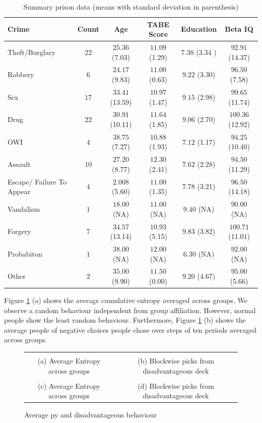 \documentclass[12pt,a4paper,bibliography=totocnumbered,listof=totocnumbered]{scrartcl}
\begin{document}
\begin{table}[H]
	\scriptsize
	 \centering 
	\begin{tabular}{ l|ccccc} 
		\toprule 
		Crime & \textbf{Count} & \textbf{Age} & \textbf{TABE Score} & \textbf{Education} & \textbf{Beta IQ} \\ 
		\hline
	Theft/Burglary & $22$ & $25.36$  (7.03) & $11.09$ (1.29) & $7.38$ (3.34 )& $92.91$ (14.37) \\ 
	Robbery & $6$ & $24.17$ (9.83) & $11.00$ (0.63) & $9.22$ (3.30) & $96.50$ (7.58) \\          
	Sex & $17$ & $33.41$ (13.59) & $10.97$ (1.47) & $9.15$ (2.98) & $99.65$ (11.74) \\       
	Drug & $22$ & $30.91$ (10.11)  & $11.64$ (1.85)& $9.06$   (2.70)  & $100.36$ (12.92) \\     
	OWI & $4$ & $38.75$ (7.27) & $10.88$ (1.93) & $7.12$ (1.17)& $94.25$ (10.40) \\        
	Assault & $10$ & $27.20$ (8.77) & $12.30$ (2.41)& $7.62$ (2.28) & $94.50$ (11.29) \\       
	Escape/ Failure To Appear & $4$ & $2.008$ (5.60)& $11.00$ (1.35)& $7.78$  (3.21)& $96.50$  (14.18)\\     
	Vandalism & $1$ & $18.00$ (NA)& $11.00$ (NA)& $9.40$ (NA)& $90.00$ (NA)\\ 
	Forgery & $7$ & $34.57$ (13.14)& $10.93$ (5.15) & $9.83$ (3.82)& $100.71$ (11.01)\\       
	Probabiton & $1$ & $38.00$ (NA)& $12.00$ (NA)& $6.30$ (NA)& $92.00$ (NA)\\ 
	Other & $2$ & $35.00$ (9.90)& $11.50$ (0.00)& $9.20$ (4.67)& $95.00$ (5.66)\\       
		\bottomrule 
	\end{tabular} 
		\caption{Summary prison data (means with standard deviation in parenthesis)} 
		\label{tab:tabps} 
\end{table} 

Figure \ref{fig:ent} (a) shows the average cumulative entropy averaged across groups. We observe a random behaviour independent from group affiliation. However, normal people show the least random behaviour. Furthermore, Figure \ref{fig:ent} (b) shows the average people of negative choices people chose over steps of ten periods averaged across groups.     

\setlength{\tabcolsep}{-0.2cm}
\renewcommand{\arraystretch}{-0.6}
\begin{figure}[H]
	\small
	\begin{tabular}{cc}
	 &  \\
	(a) Average Entropy across groups & (b) Blockwise picks from disadvantageous deck \\
	 &  \\
	(c) Average Entropy across groups & (d) Blockwise picks from disadvantageous deck 
	\end{tabular}
	\caption{Average py and disadvantageous behaviour}
	\label{fig:ent}
\end{figure}
\end{document}
